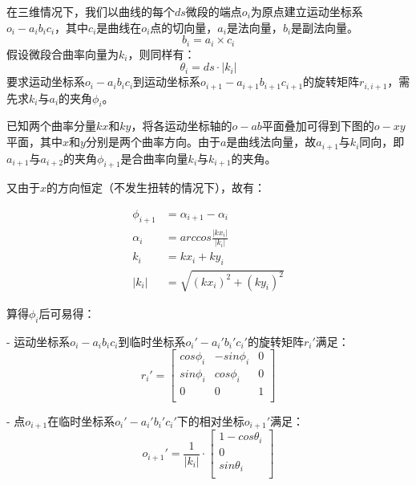 在三维情况下，我们以曲线的每个$ds$微段的端点$o_i$为原点建立运动坐标系 $o_i-a_ib_ic_i$，其中$c_i$是曲线在$o_i$点的切向量，$a_i$是法向量，$b_i$是副法向量。
\begin{equation}
b_i = a_i \times c_i
\end{equation}
假设微段合曲率向量为$k_i$，则同样有：
\begin{equation}
\theta_i = ds\cdot |k_i|
\end{equation}
要求运动坐标系$o_i-a_ib_ic_i$到运动坐标系$o_{i+1}-a_{i+1}b_{i+1}c_{i+1}$的旋转矩阵$r_{i, i+1}$，需先求$k_i$与$a_i$的夹角$\phi_i$。

已知两个曲率分量$kx$和$ky$，将各运动坐标轴的$o-ab$平面叠加可得到下图的$o-xy$平面，其中$x$和$y$分别是两个曲率方向。由于$a$是曲线法向量，故$a_{i+1}$与$k_i$同向，即$a_{i+1}$与$a_{i+2}$的夹角$\phi_{i+1}$是合曲率向量$k_i$与$k_{i+1}$的夹角。

\begin{center}
    
\end{center}

又由于$x$的方向恒定（不发生扭转的情况下），故有：

\begin{align}
\phi_{i+1} &= \alpha_{i+1} - \alpha_i \\
\alpha_i &= arccos\frac{|kx_i|}{|k_i|} \\
k_i &= kx_i + ky_i \\
|k_i| &= \sqrt{(kx_i)^2 + (ky_i)^2}
\end{align}

算得$\phi_i$后可易得：

- 运动坐标系$o_i-a_ib_ic_i$到临时坐标系$o_i'-a_i'b_i'c_i'$的旋转矩阵$r_i'$满足：
    \begin{equation}
    r_i' = \left[
            \begin{matrix}
            cos\phi_i & -sin\phi_i & 0\\
            sin\phi_i & cos\phi_i & 0\\
            0 & 0 & 1\\
            \end{matrix}
        \right]
    \end{equation}
    
- 点$o_{i+1}$在临时坐标系$o_i'-a_i'b_i'c_i'$下的相对坐标$o_{i+1}'$满足：
    \begin{equation}
    o_{i+1}' = \frac{1}{|k_i|} \cdot \left[
      \begin{matrix}
    	1 - cos\theta_i\\
    	0 \\
      sin\theta_i\\
      \end{matrix}
    \right]
    \end{equation}
    
